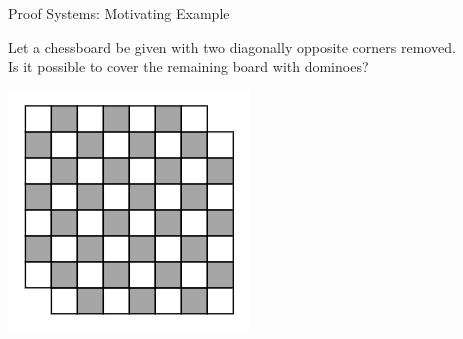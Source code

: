 \documentclass[t]{sdqbeamer}
\begin{document}
\begin{frame}{Proof Systems: Motivating Example}
\begin{example}
Let a chessboard be given with two diagonally opposite corners removed.\\
Is it possible to cover the remaining board with dominoes?\\[1ex]
\begin{center}
\includegraphics[width=.2\linewidth]{figures/l12/mcb0.png}
\end{center}
\end{example}
\end{frame}
\end{document}
